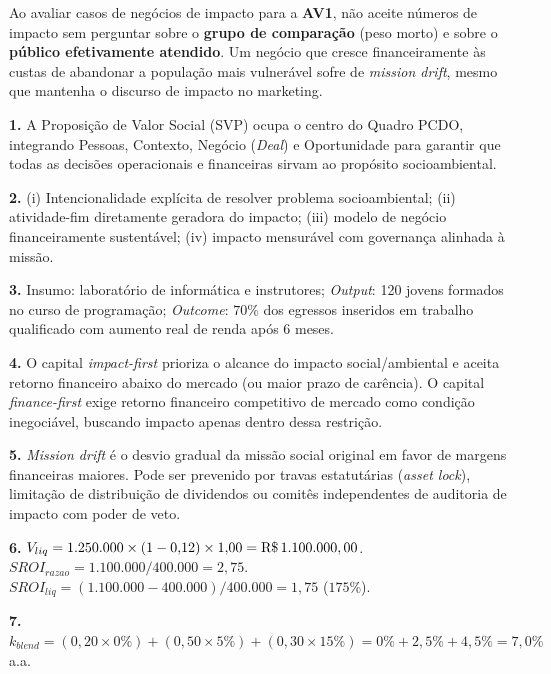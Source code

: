 \begin{boxDica}
Ao avaliar casos de negócios de impacto para a \textbf{AV1}, não aceite números de impacto sem perguntar sobre o \textbf{grupo de comparação} (peso morto) e sobre o \textbf{público efetivamente atendido}. Um negócio que cresce financeiramente às custas de abandonar a população mais vulnerável sofre de \textit{mission drift}, mesmo que mantenha o discurso de impacto no marketing.
\end{boxDica}

\clearpage
{}

\begin{boxGabarito}
\textbf{1.} A Proposição de Valor Social (SVP) ocupa o centro do Quadro PCDO, integrando Pessoas, Contexto, Negócio (\textit{Deal}) e Oportunidade para garantir que todas as decisões operacionais e financeiras sirvam ao propósito socioambiental.

\textbf{2.} (i) Intencionalidade explícita de resolver problema socioambiental; (ii) atividade-fim diretamente geradora do impacto; (iii) modelo de negócio financeiramente sustentável; (iv) impacto mensurável com governança alinhada à missão.

\textbf{3.} Insumo: laboratório de informática e instrutores; \textit{Output}: 120 jovens formados no curso de programação; \textit{Outcome}: $70\%$ dos egressos inseridos em trabalho qualificado com aumento real de renda após 6 meses.

\textbf{4.} O capital \textit{impact-first} prioriza o alcance do impacto social/ambiental e aceita retorno financeiro abaixo do mercado (ou maior prazo de carência). O capital \textit{finance-first} exige retorno financeiro competitivo de mercado como condição inegociável, buscando impacto apenas dentro dessa restrição.

\textbf{5.} \textit{Mission drift} é o desvio gradual da missão social original em favor de margens financeiras maiores. Pode ser prevenido por travas estatutárias (\textit{asset lock}), limitação de distribuição de dividendos ou comitês independentes de auditoria de impacto com poder de veto.

\textbf{6.} $V_{liq} = 1.250.000 \times (1 - 0{,}12) \times 1{,}00 = \text{R\$\,}{1.100.000,00}$. $SROI_{razao} = 1.100.000 / 400.000 = 2{,}75$. $SROI_{liq} = (1.100.000 - 400.000)/400.000 = 1{,}75$ ($175\%$).

\textbf{7.} $k_{blend} = (0{,}20 \times 0\%) + (0{,}50 \times 5\%) + (0{,}30 \times 15\%) = 0\% + 2{,}5\% + 4{,}5\% = 7{,}0\%$ a.a.


\end{boxGabarito}

